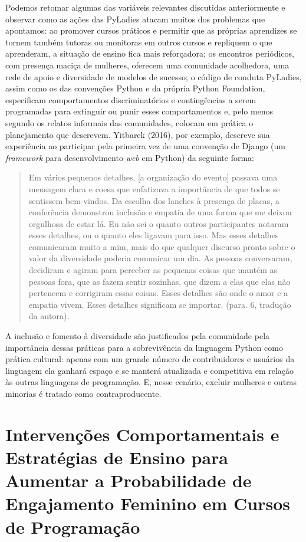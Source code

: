 Podemos retomar algumas das variáveis relevantes discutidas anteriormente e observar como as ações das PyLadies atacam muitos dos problemas que apontamos: ao promover cursos práticos e permitir que as próprias aprendizes se tornem também tutoras ou monitoras em outros cursos e repliquem o que aprenderam, a situação de ensino fica mais reforçadora; os encontros periódicos, com presença maciça de mulheres, oferecem uma comunidade acolhedora, uma rede de apoio e diversidade de modelos de sucesso; o código de conduta PyLadies, assim como os das convenções Python e da própria Python Foundation, especificam comportamentos discriminatórios e contingências a serem programadas para extinguir ou punir esses comportamentos e, pelo menos segundo os relatos informais das comunidades, colocam em prática o planejamento que descrevem. Yitbarek (2016), por exemplo, descreve sua experiência ao participar pela primeira vez de uma convenção de Django (um \textit{framework} para desenvolvimento \textit{web} em Python) da seguinte forma:

\begin{quote}
    Em vários pequenos detalhes, [a organização do evento] passava uma mensagem clara e coesa que enfatizava a importância de que todos se sentissem bem-vindos. Da escolha dos lanches à presença de placas, a conferência demonstrou inclusão e empatia de uma forma que me deixou orgulhosa de estar lá. Eu não sei o quanto outros participantes notaram esses detalhes, ou o quanto eles ligavam para isso. Mas esses detalhes comunicaram muito a mim, mais do que qualquer discurso pronto sobre o valor da diversidade poderia comunicar um dia. As pessoas conversaram, decidiram e agiram para perceber as pequenas coisas que mantém as pessoas fora, que as fazem sentir sozinhas, que dizem a elas que elas não pertencem e corrigiram essas coisas. Esses detalhes são onde o amor e a empatia vivem. Esses detalhes significam se importar. (para. 6, tradução da autora).
\end{quote}

A inclusão e fomento à diversidade são justificados pela comunidade pela importância dessas práticas para a sobrevivência da linguagem Python como prática cultural: apenas com um grande número de contribuidores e usuários da linguagem ela ganhará espaço e se manterá atualizada e competitiva em relação às outras linguagens de programação. E, nesse cenário, excluir mulheres e outras minorias é tratado como contraproducente.

\section*{Intervenções Comportamentais e Estratégias de Ensino para Aumentar a Probabilidade de Engajamento Feminino em Cursos de Programação}

